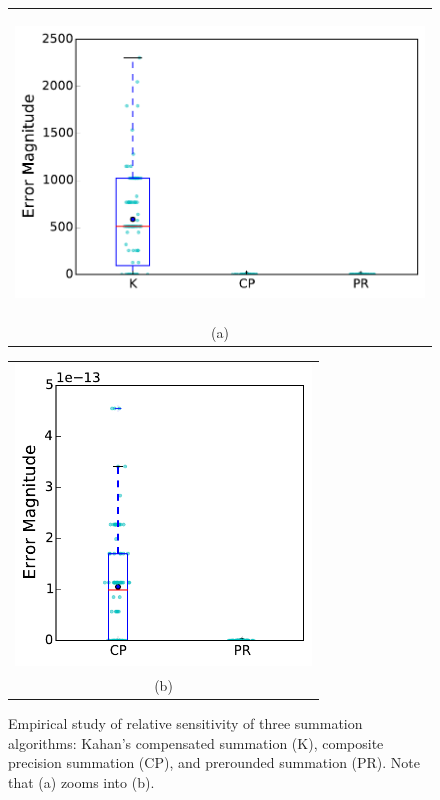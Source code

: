 \begin{figure}[!htb]
\centering
{}
\begin{tabular}{c}
\includegraphics[width=\textwidth, height=8cm]{chapter_2_figures/draft_boxplot_alt_balanced_N=1048576.pdf} \\ 
(a) \\
\end{tabular}
\endminipage
{}
\begin{tabular}{c}
\includegraphics[width=\textwidth, height=8cm]{chapter_2_figures/draft_boxplot_balanced_cp_vs_preround_N=1048576.pdf}
\\ (b) \\
\end{tabular}
\endminipage
\caption{Empirical study of relative sensitivity of three summation
  algorithms: Kahan's compensated summation (K), composite precision
  summation (CP), and prerounded summation (PR). Note that (a) zooms
  into (b). }
\label{fig:avgalgorithms}
\end{figure}


